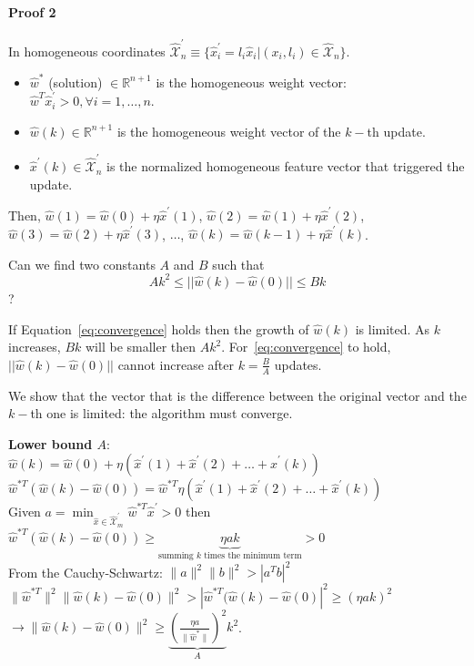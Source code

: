 \documentclass[main]{subfiles}
\begin{document}
\paragraph{Proof 2}
In homogeneous coordinates $\mathcal{\hat{X}}^{\prime}_{n} \equiv \{ \hat{x}^{\prime}_{i} = l_i \hat{x}_i | (x_i, l_i) \in \mathcal{\hat{X}}_{n} \}$.

\begin{itemize}
\item $\hat{w}^{*}$ (solution) $\in \mathbb{R}^{n+1}$ is the homogeneous weight vector: $\hat{w}^T \hat{x}^{\prime}_i > 0, \forall i = 1, \dots, n$.
\item $\hat{w}(k) \in \mathbb{R}^{n+1}$ is the homogeneous weight vector of the $k-$th update.
\item $\hat{x}^{\prime}(k) \in \mathcal{\hat{X}}^{\prime}_n$ is the normalized homogeneous feature vector that triggered the update.
\end{itemize}

Then, $\hat{w}(1) = \hat{w}(0) + \eta \hat{x}^{\prime}(1)$, $\hat{w}(2) = \hat{w}(1) + \eta \hat{x}^{\prime}(2)$, $\hat{w}(3) = \hat{w}(2) + \eta \hat{x}^{\prime}(3)$, $\dots$, $\hat{w}(k) = \hat{w}(k-1) + \eta \hat{x}^{\prime}(k)$.

Can we find two constants $A$ and $B$ such that
\begin{equation}
Ak^2 \leq || \hat{w}(k) - \hat{w}(0) || \leq Bk
\label{eq:convergence}
\end{equation}
?

If Equation~\ref{eq:convergence} holds then the growth of $\hat{w}(k)$ is limited.
As $k$ increases, $Bk$ will be smaller then $Ak^2$.
For~\ref{eq:convergence} to hold, $|| \hat{w}(k) - \hat{w}(0) ||$ cannot increase after $k = \frac{B}{A}$ updates.

We show that the vector that is the difference between the original vector and the $k-$th one is limited: the algorithm must converge.

\textbf{Lower bound $A$}:\\
\indent \indent $\hat{w}(k) = \hat{w}(0) + \eta (\hat{x}^{\prime}(1) + \hat{x}^{\prime}(2) + \dots + \hat{x}^{\prime}(k))$\\
\indent \indent $\hat{w}^{*T} (\hat{w}(k) - \hat{w}(0)) = \hat{w}^{*T} \eta (\hat{x}^{\prime}(1) + \hat{x}^{\prime}(2) + \dots + \hat{x}^{\prime}(k))$ \\
\indent \indent Given $a = \min_{\hat{x} \in \hat{\mathcal{X}}^{\prime}_{m}} \hat{w}^{*T} \hat{x}^{\prime} > 0$ then $\hat{w}^{*T}(\hat{w}(k) - \hat{w}(0)) \geq \underbrace{\eta a k}_{\text{summing $k$ times the minimum term}} > 0$\\
\indent \indent From the Cauchy-Schwartz: $\| a \|^2 \| b \| ^2 > |a^T b |^2$\\
\indent \indent $\|\hat{w}^{*T}\|^2 \|\hat{w}(k) - \hat{w}(0) \|^2 > | \hat{w}^{*T} (\hat{w}(k) - \hat{w}(0)|^2 \geq (\eta a k )^2$ \\
\indent \indent $\rightarrow \| \hat{w}(k) - \hat{w}(0)\|^2 \geq \underbrace{\left( \frac{\eta a}{\| \hat{w}^* \|} \right)^2}_{A} k^2$.\\
\end{document}
